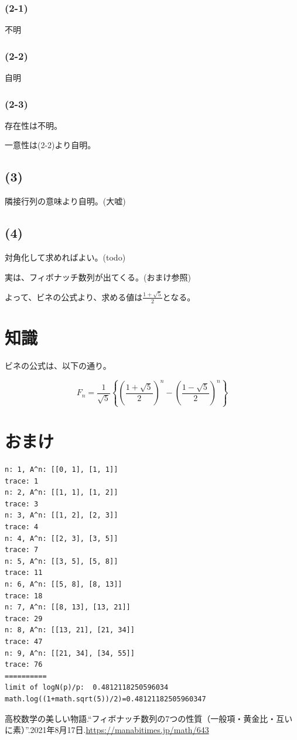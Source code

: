 \documentclass[a4paper, 10pt, dvipdfmx]{jlreq}
\begin{document}
\subsubsection*{(2-1)}

不明

\subsubsection*{(2-2)}

自明

\subsubsection*{(2-3)}

存在性は不明。

一意性は(2-2)より自明。

\subsection*{(3)}

隣接行列の意味より自明。(大嘘)

\subsection*{(4)}

対角化して求めればよい。(todo)

実は、フィボナッチ数列が出てくる。(おまけ参照)

よって、ビネの公式より、求める値は$\frac{1+\sqrt{5}}{2}$となる。

\section{知識}

ビネの公式は、以下の通り。\cite{site:binet}

\begin{equation*}
  F_n=\frac{1}{\sqrt{5}}\left\{ \left( \frac{1+\sqrt{5}}{2} \right)^n - \left( \frac{1-\sqrt{5}}{2} \right)^n \right\}
\end{equation*}

\section{おまけ}



\begin{lstlisting}[caption=result, label=code:result]
n: 1, A^n: [[0, 1], [1, 1]]
trace: 1
n: 2, A^n: [[1, 1], [1, 2]]
trace: 3
n: 3, A^n: [[1, 2], [2, 3]]
trace: 4
n: 4, A^n: [[2, 3], [3, 5]]
trace: 7
n: 5, A^n: [[3, 5], [5, 8]]
trace: 11
n: 6, A^n: [[5, 8], [8, 13]]
trace: 18
n: 7, A^n: [[8, 13], [13, 21]]
trace: 29
n: 8, A^n: [[13, 21], [21, 34]]
trace: 47
n: 9, A^n: [[21, 34], [34, 55]]
trace: 76
==========
limit of logN(p)/p:  0.4812118250596034
math.log((1+math.sqrt(5))/2)=0.48121182505960347
\end{lstlisting}

\begin{thebibliography}{9}
  高校数学の美しい物語.``フィボナッチ数列の7つの性質（一般項・黄金比・互いに素）''.2021年8月17日.\url{https://manabitimes.jp/math/643}
\end{thebibliography}
\end{document}

